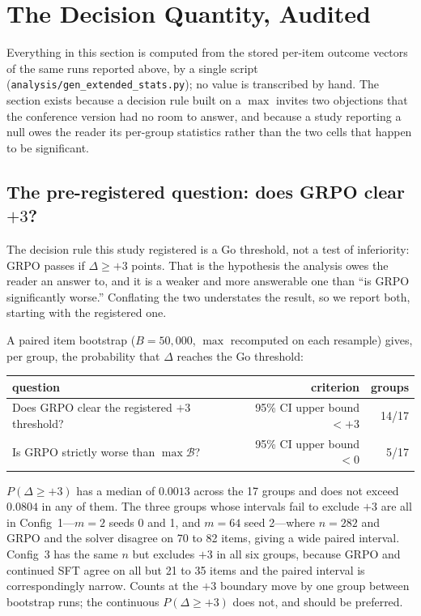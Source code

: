\section{The Decision Quantity, Audited}
\label{sec:statistics}

Everything in this section is computed from the stored per-item outcome vectors
of the same runs reported above, by a single script
(\texttt{analysis/gen\_extended\_stats.py}); no value is transcribed by hand.
The section exists because a decision rule built on a $\max$ invites two
objections that the conference version had no room to answer, and because a
study reporting a null owes the reader its per-group statistics rather than the
two cells that happen to be significant.

\subsection{The pre-registered question: does GRPO clear $+3$?}
\label{subsec:gotest}

The decision rule this study registered is a Go threshold, not a test of
inferiority: GRPO passes if $\Delta \geq +3$ points. That is the hypothesis the
analysis owes the reader an answer to, and it is a weaker and more answerable
one than ``is GRPO significantly worse.'' Conflating the two understates the
result, so we report both, starting with the registered one.

A paired item bootstrap ($B = 50{,}000$, $\max$ recomputed on each resample)
gives, per group, the probability that $\Delta$ reaches the Go threshold:

\begin{center}
\begin{tabular}{lrr}
\toprule
question & criterion & groups \\
\midrule
Does GRPO clear the registered $+3$ threshold? & 95\% CI upper bound $< +3$ & 14/17 \\
Is GRPO strictly worse than $\max\mathcal{B}$?  & 95\% CI upper bound $< 0$  & 5/17 \\
\bottomrule
\end{tabular}
\end{center}

$P(\Delta \geq +3)$ has a median of $0.0013$ across the 17 groups and does not
exceed $0.0804$ in any of them. The three groups whose intervals fail to
exclude $+3$ are all in Config~1---$m{=}2$ seeds 0 and 1, and $m{=}64$ seed
2---where $n{=}282$ and GRPO and the solver disagree on 70 to 82 items, giving a
wide paired interval. Config~3 has the same $n$ but excludes $+3$ in all six
groups, because GRPO and continued SFT agree on all but 21 to 35 items and the
paired interval is correspondingly narrow. Counts at the $+3$ boundary move by
one group between bootstrap runs; the continuous $P(\Delta \geq +3)$ does not,
and should be preferred.

